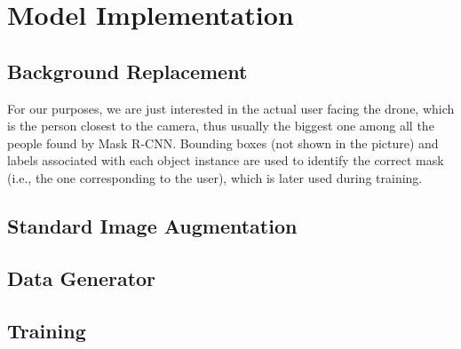 \chapter{Model Implementation}
\label{chap:implementation}



\section{Background Replacement}
\label{sec:implementation-bgreplace}

For our purposes, we are just interested in the actual user facing the drone, which is the person closest to the camera, thus usually the biggest one among all the people found by Mask R-CNN. Bounding boxes (not shown in the picture) and labels associated with each object instance are used to identify the correct mask (i.e., the one corresponding to the user), which is later used during training.




\section{Standard Image Augmentation}
\label{sec:implementation-imgaug}

\lipsum[1]




\section{Data Generator}
\label{sec:implementation-generator}

\lipsum[1]




\section{Training}
\label{sec:implementation-training}

\lipsum[1]